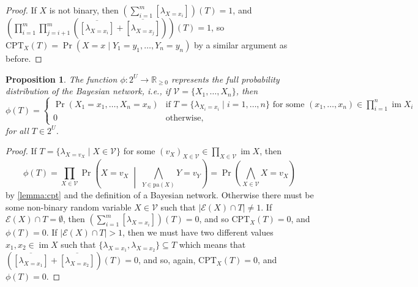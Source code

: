 \documentclass{article}
\newtheorem{proposition}{Proposition}
\theoremstyle{definition}
\theoremstyle{remark}
\DeclareMathOperator{\im}{im}
\begin{document}
{\begin{proof}
  If $X$ is not binary, then $\left( \sum_{i=1}^m [\lambda_{X = x_i}]
  \right)(T) = 1$, and $\left( \prod_{i=1}^m \prod_{j=i+1}^m
    (\overline{[\lambda_{X = x_i}]} + \overline{[\lambda_{X = x_j}]})
  \right)(T) = 1$, so $\mathrm{CPT}_X(T) = \Pr(X = x \mid Y_1 = y_1,
  \dots, Y_n = y_n)$ by a similar argument as before.
\end{proof}

\begin{proposition} \label{lemma:full_distribution}
  The function $\phi\colon 2^U \to \mathbb{R}_{\ge 0}$ represents the full
  probability distribution of the Bayesian network, i.e., if $\mathcal{V} = \{
  X_1, \dots, X_n\}$, then
  \[
    \phi(T) =
    \begin{cases}
      \Pr(X_1 = x_1, \dots, X_n = x_n) & \text{if } T = \{ \lambda_{X_i=x_i}
      \mid i = 1, \dots, n \} \text{ for some } (x_1, \dots, x_n) \in
      \prod_{i=1}^n \im X_i \\
      0 & \text{otherwise,}
    \end{cases}
  \]
  for all $T \in 2^U$.
\end{proposition}
\begin{proof}
  If $T = \{ \lambda_{X=v_X} \mid X \in \mathcal{V} \}$ for some $(v_X)_{X
    \in \mathcal{V}} \in \prod_{X \in \mathcal{V}} \im X$, then
  \[
    \phi(T) = \prod_{X \in \mathcal{V}} \Pr \left( X=v_X \;\middle|\;
      \bigwedge_{Y \in \mathrm{pa}(X)} Y=v_Y \right) = \Pr \left( \bigwedge_{X
        \in \mathcal{V}} X=v_X \right)
  \]
  by \cref{lemma:cpt} and the definition of a Bayesian network. Otherwise there
  must be some non-binary random variable $X \in \mathcal{V}$ such that
  $|\mathcal{E}(X) \cap T| \ne 1$. If $\mathcal{E}(X) \cap T = \emptyset$, then
  $\left( \sum_{i=1}^m [\lambda_{X = x_i}] \right)(T) = 0$, and so
  $\mathrm{CPT}_X(T) = 0$, and $\phi(T) = 0$. If $|\mathcal{E}(X) \cap T| > 1$,
  then we must have two different values $x_1, x_2 \in \im X$ such that
  $\{\lambda_{X=x_1}, \lambda_{X=x_2} \} \subseteq T$ which means that
  $(\overline{[\lambda_{X=x_1}]} + \overline{[\lambda_{X=x_2}]})(T) = 0$, and
  so, again, $\mathrm{CPT}_X(T) = 0$, and $\phi(T) = 0$.
\end{proof}

}
\end{document}

